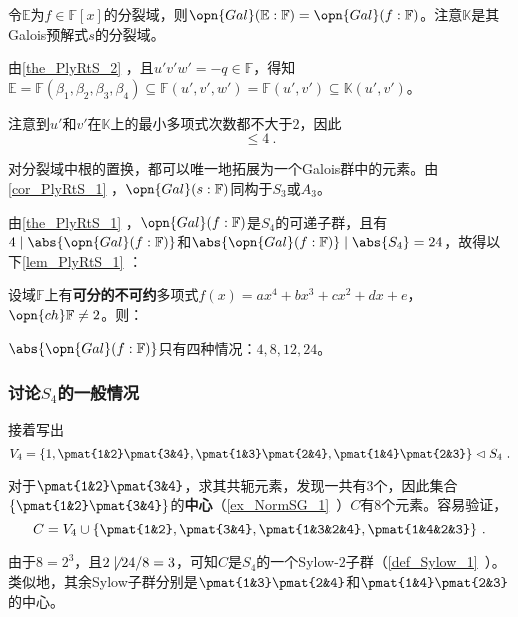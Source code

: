 令$\mathbb{E}$为$f\in\mathbb{F}[x]$的分裂域，则$\opn{Gal}(\mathbb{E}:\mathbb{F})=\opn{Gal}(f:\mathbb{F})$。注意$\mathbb{K}$是其Galois预解式$s$的分裂域。

由\autoref{the_PlyRtS_2} ，且$u'v'w'=-q\in\mathbb{F}$，得知$\mathbb{E}=\mathbb{F}(\beta_1, \beta_2, \beta_3, \beta_4)\subseteq\mathbb{F}(u', v', w')=\mathbb{F}(u', v')\subseteq\mathbb{K}(u', v')$。

注意到$u'$和$v'$在$\mathbb{K}$上的最小多项式次数都不大于$2$，因此
\begin{equation}
[\mathbb{E}:\mathbb{K}]\leq 4~.
\end{equation}

对分裂域中根的置换，都可以唯一地拓展为一个Galois群中的元素。由\autoref{cor_PlyRtS_1} ，$\opn{Gal}(s:\mathbb{F})$同构于$S_3$或$A_3$。

由\autoref{the_PlyRtS_1} ，$\opn{Gal}(f:\mathbb{F})$是$S_4$的可递子群，且有$4\mid\abs{\opn{Gal}(f:\mathbb{F})}$和$\abs{\opn{Gal}(f:\mathbb{F})}\mid \abs{S_4}=24$，故得以下\autoref{lem_PlyRtS_1} ：

\begin{lemma}{}\label{lem_PlyRtS_1}
设域$\mathbb{F}$上有\textbf{可分的不可约}多项式$f(x)=ax^4+bx^3+cx^2+dx+e$，$\opn{ch}\mathbb{F}\neq 2$。则：

$\abs{\opn{Gal}(f:\mathbb{F})}$只有四种情况：$4, 8, 12, 24$。
\end{lemma}



\subsubsection{讨论$S_4$的一般情况}




接着写出
\begin{equation}
V_4=\{1, \pmat{1&2}\pmat{3&4}, \pmat{1&3}\pmat{2&4}, \pmat{1&4}\pmat{2&3}\}\vartriangleleft S_4~.
\end{equation}

对于$\pmat{1&2}\pmat{3&4}$，求其共轭元素，发现一共有$3$个，因此集合$\{\pmat{1&2}\pmat{3&4}\}$的\textbf{中心}（\autoref{ex_NormSG_1}~）$C$有$8$个元素。容易验证，
\begin{equation}\label{eq_PlyRtS_10}
C = V_4\cup\{\pmat{1&2}, \pmat{3&4}, \pmat{1&3&2&4}, \pmat{1&4&2&3}\}~.
\end{equation}

由于$8=2^3$，且$2\not\mid 24/8=3$，可知$C$是$S_4$的一个Sylow-$2$子群（\autoref{def_Sylow_1}~）。类似地，其余Sylow子群分别是$\pmat{1&3}\pmat{2&4}$和$\pmat{1&4}\pmat{2&3}$的中心。

